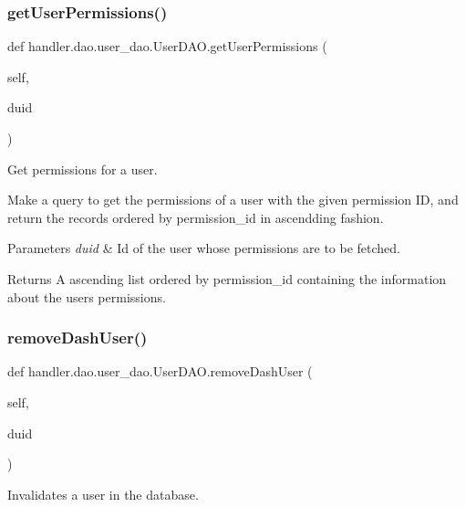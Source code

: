\subsubsection{\texorpdfstring{get\+User\+Permissions()}{getUserPermissions()}}
{\footnotesize\ttfamily def handler.\+dao.\+user\+\_\+dao.\+User\+D\+A\+O.\+get\+User\+Permissions (\begin{DoxyParamCaption}\item[{}]{self,  }\item[{}]{duid }\end{DoxyParamCaption})}



Get permissions for a user. 

Make a query to get the permissions of a user with the given permission ID, and return the records ordered by permission\+\_\+id in ascendding fashion.


\begin{DoxyParams}{Parameters}
{\em duid} & Id of the user whose permissions are to be fetched.\\
\hline
\end{DoxyParams}
\begin{DoxyReturn}{Returns}
A ascending list ordered by permission\+\_\+id containing the information about the user\textquotesingle{}s permissions. 
\end{DoxyReturn}
\mbox{\label{classhandler_1_1dao_1_1user__dao_1_1_user_d_a_o_a511ca5cdef0bc6e549c11e5f51dd831c}} 
\subsubsection{\texorpdfstring{remove\+Dash\+User()}{removeDashUser()}}
{\footnotesize\ttfamily def handler.\+dao.\+user\+\_\+dao.\+User\+D\+A\+O.\+remove\+Dash\+User (\begin{DoxyParamCaption}\item[{}]{self,  }\item[{}]{duid }\end{DoxyParamCaption})}



Invalidates a user in the database. 

